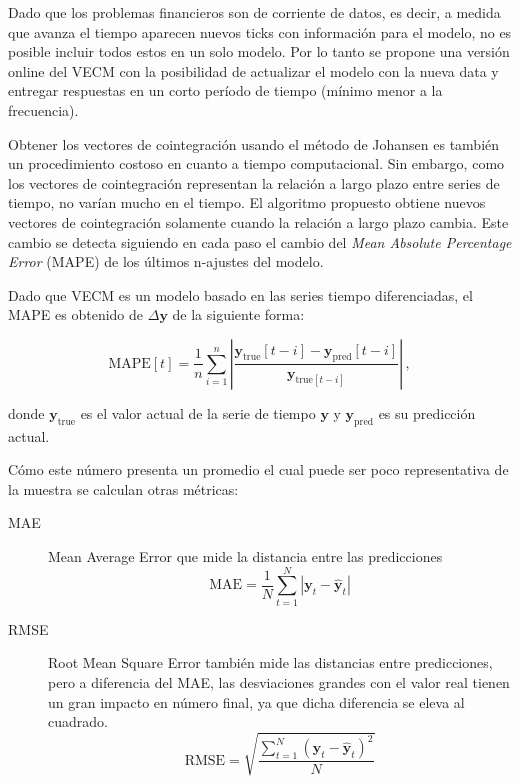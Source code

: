 Dado que los problemas financieros son de corriente de datos, es decir, a
medida que avanza el tiempo aparecen nuevos ticks con información para el
modelo, no es posible incluir todos estos en un solo modelo.  Por lo tanto se
propone una versión online del VECM con la posibilidad de actualizar el modelo
con la nueva data y entregar respuestas en un corto período de tiempo (mínimo
menor a la frecuencia).

Obtener los vectores de cointegración usando el método de Johansen es también
un procedimiento costoso en cuanto a tiempo computacional. Sin embargo, como
los vectores de cointegración representan la relación a largo plazo entre
series de tiempo, no varían mucho en el tiempo. El algoritmo propuesto obtiene
nuevos vectores de cointegración solamente cuando la relación a largo plazo
cambia. Este cambio se detecta siguiendo en cada paso el cambio del \emph{Mean
Absolute Percentage Error} (MAPE) de los últimos n-ajustes del modelo.

Dado que VECM es un modelo basado en las series tiempo diferenciadas, el MAPE
es obtenido de $\Delta \mathbf{y}$ de la siguiente forma:

\begin{equation}\label{eq:MAPE}
\text{MAPE}[t] = \frac{1}{n} \sum_{i=1}^{n} \left| 
\frac{\mathbf{y}_{\text{true}}[t-i]-
\mathbf{y}_{\text{pred}}[t-i]}{\mathbf{y}_{\text{true}[t-i]}}
\right| \, , 
\end{equation}

\noindent donde $\mathbf{y}_{\text{true}}$ es el valor actual de la
serie de tiempo $\mathbf{y}$ y $\mathbf{y}_{\text{pred}}$
es su predicción actual.

Cómo este número presenta un promedio el cual puede ser poco representativa de
la muestra se calculan otras métricas:

\begin{description}
\item[MAE] Mean Average Error que mide la distancia entre las predicciones
\begin{equation}\label{eq:MAE}
\text{MAE} = \frac{1}{N} \sum_{t=1}^{N} 
\left| 
\mathbf{y}_t-\hat{\mathbf{y}}_t
\right| 
\end{equation}
\item[RMSE] Root Mean Square Error también mide las distancias entre
predicciones, pero a diferencia del MAE, las desviaciones grandes con el valor
real tienen un gran impacto en número final, ya que dicha diferencia se eleva
al cuadrado.
\begin{equation}\label{eq:RMSE}
\text{RMSE} = \sqrt{
\frac{\displaystyle \sum_{t=1}^{N} (\mathbf{y}_t-\hat{\mathbf{y}}_t)^2}{N}}
\end{equation}
\end{description}

